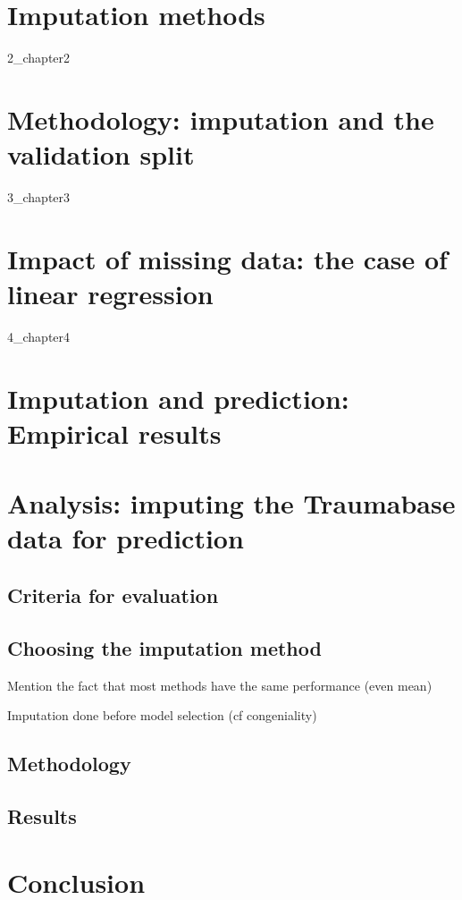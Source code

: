\documentclass[12pt, a4paper]{memoir}
\begin{document}
\chapter{Imputation methods}
\label{imputation}
{2_chapter2}
		
\chapter{Methodology: imputation and the validation split}
\label{validation}
{3_chapter3}
		
		
\chapter{Impact of missing data: the case of linear regression}
\label{linreg}
{4_chapter4} 

\chapter{Imputation and prediction: Empirical results}
\label{empirical}


\chapter{Analysis: imputing the Traumabase data for prediction}
\label{analysis}
	\section{Criteria for evaluation}
	\section{Choosing the imputation method}
		Mention the fact that most methods have the same performance (even mean)
		
		Imputation done before model selection (cf congeniality)
	\section{Methodology}
	
	\section{Results}
	\label{results}

\chapter*{Conclusion}


\end{document}
